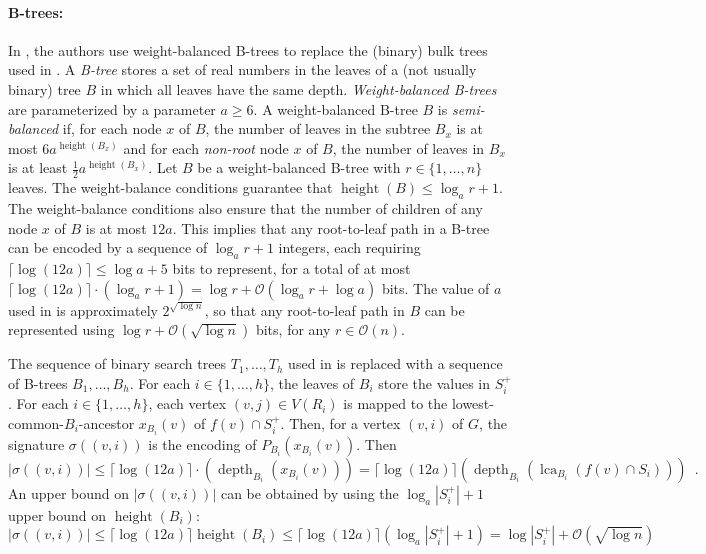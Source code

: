 \documentclass{patmorin}
\renewcommand{\ge}{\geqslant}
\renewcommand{\le}{\leqslant}
\newcommand{\defin}[1]{\emph{\textcolor{brightmaroon}{#1}}}
\DeclareMathOperator{\height}{height}
\DeclareMathOperator{\depth}{depth}
\DeclareMathOperator{\lca}{lca}
\newcommand{\Oh}{\calO}
\newcommand{\calO}{\mathcal{O}}
\begin{document}
  \paragraph{B-trees:}
  In \cite{gawrychowski.janczewski:simpler}, the authors use weight-balanced B-trees to replace the (binary) bulk trees used in \cite{dujmovic.esperet.ea:adjacency}.
  A \defin{B-tree} stores a set of real numbers in the leaves of a (not usually binary) tree $B$ in which all leaves have the same depth.
  \defin{Weight-balanced B-trees} are parameterized by a parameter $a\ge 6$.  A weight-balanced B-tree $B$ is \defin{semi-balanced} if, for each node $x$ of $B$, the number of leaves in the subtree $B_x$ is at most $6a^{\height(B_x)}$ and for each \emph{non-root} node $x$ of $B$, the number of leaves in $B_x$ is at least $\tfrac{1}{2}a^{\height(B_x)}$.
  Let $B$ be a weight-balanced B-tree with $r\in \{1,\ldots,n\}$ leaves.  The weight-balance conditions guarantee that $\height(B)\le \log_a r + 1$.
  The weight-balance conditions also ensure that the number of children of any node $x$ of $B$ is at most $12a$.
  This implies that any root-to-leaf path in a B-tree can be encoded by a sequence of $\log_a r+1$ integers, each requiring $\lceil\log(12a)\rceil\le \log a + 5$ bits to represent, for a total of at most $\lceil\log(12a)\rceil\cdot(\log_a r+1)=\log r + \Oh(\log_a r + \log a)$ bits.
  The value of $a$ used in \cite{gawrychowski.janczewski:simpler} is approximately $2^{\sqrt{\log n}}$, so that any root-to-leaf path in $B$ can be represented using $\log r + \Oh(\sqrt{\log n})$ bits, for any $r\in\Oh(n)$.

  The sequence of binary search trees $T_1,\ldots,T_h$ used in \cite{gawrychowski.janczewski:simpler} is replaced with a sequence of B-trees $B_1,\ldots,B_h$.
  For each $i\in\{1,\ldots,h\}$, the leaves of $B_i$ store the values in $S^+_i$.
  For each $i\in\{1,\ldots,h\}$, each vertex $(v,j)\in V(R_i)$ is mapped to the lowest-common-$B_i$-ancestor $x_{B_i}(v)$ of $f(v)\cap S^+_i$.
  Then, for a vertex $(v,i)$ of $G$, the signature $\sigma((v,i))$ is the encoding of $P_{B_i}(x_{B_i}(v))$.
  Then
  \[
    |\sigma((v,i))| \le \lceil\log (12a)\rceil\cdot(\depth_{B_i}(x_{B_i}(v))) = \lceil\log (12a)\rceil(\depth_{B_i}(\lca_{B_i}(f(v)\cap S_i))) \enspace .
  \]
  An upper bound on $|\sigma((v,i))|$ can be obtained by using the $\log_a |S^+_i|+1$ upper bound on $\height(B_i)$:
  \[
    |\sigma((v,i))|\le \lceil\log (12a)\rceil\height(B_i) \le \lceil\log (12a)\rceil(\log_a |S^+_i| + 1)= \log |S^+_i| + \Oh(\sqrt{\log n})
  \]
\end{document}
